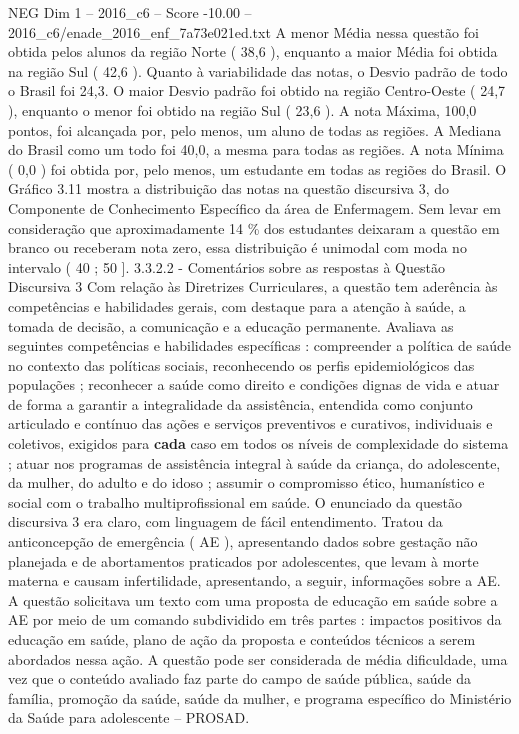 \begin{textsample}{NEG Dim 1 – 2016\_c6 – Score -10.00 – 2016\_c6/enade\_2016\_enf\_7a73e021ed.txt}
A menor Média nessa questão foi obtida pelos alunos da região Norte ( 38,6 ), enquanto a maior Média foi obtida na região Sul ( 42,6 ).
Quanto à variabilidade das notas, o Desvio padrão de todo o Brasil foi 24,3.
O maior Desvio padrão foi obtido na região Centro-Oeste ( 24,7 ), enquanto o menor foi obtido na região Sul ( 23,6 ).
A nota Máxima, 100,0 pontos, foi alcançada por, pelo menos, um aluno de todas as regiões.
A Mediana do Brasil como um todo foi 40,0, a mesma para todas as regiões.
A nota Mínima ( 0,0 ) foi obtida por, pelo menos, um estudante em todas as regiões do Brasil.
O Gráfico 3.11 mostra a distribuição das notas na questão discursiva 3, do Componente de Conhecimento Específico da área de Enfermagem.
Sem levar em consideração que aproximadamente 14 \% dos estudantes deixaram a questão em branco ou receberam nota zero, essa distribuição é unimodal com moda no intervalo ( 40 ; 50 ]. 3.3.2.2 - Comentários sobre as respostas à Questão Discursiva 3 Com relação às Diretrizes Curriculares, a questão tem aderência às competências e habilidades gerais, com destaque para a atenção à saúde, a tomada de decisão, a comunicação e a educação permanente.
Avaliava as seguintes competências e habilidades específicas : compreender a política de saúde no contexto das políticas sociais, reconhecendo os perfis epidemiológicos das populações ; reconhecer a saúde como direito e condições dignas de vida e atuar de forma a garantir a integralidade da assistência, entendida como conjunto articulado e contínuo das ações e serviços preventivos e curativos, individuais e coletivos, exigidos para \textbf{cada} caso em todos os níveis de complexidade do sistema ; atuar nos programas de assistência integral à saúde da criança, do adolescente, da mulher, do adulto e do idoso ; assumir o compromisso ético, humanístico e social com o trabalho multiprofissional em saúde.
O enunciado da questão discursiva 3 era claro, com linguagem de fácil entendimento.
Tratou da anticoncepção de emergência ( AE ), apresentando dados sobre gestação não planejada e de abortamentos praticados por adolescentes, que levam à morte materna e causam infertilidade, apresentando, a seguir, informações sobre a AE.
A questão solicitava um texto com uma proposta de educação em saúde sobre a AE por meio de um comando subdividido em três partes : impactos positivos da educação em saúde, plano de ação da proposta e conteúdos técnicos a serem abordados nessa ação.
A questão pode ser considerada de média dificuldade, uma vez que o conteúdo avaliado faz parte do campo de saúde pública, saúde da família, promoção da saúde, saúde da mulher, e programa específico do Ministério da Saúde para adolescente – PROSAD.

\end{textsample}
